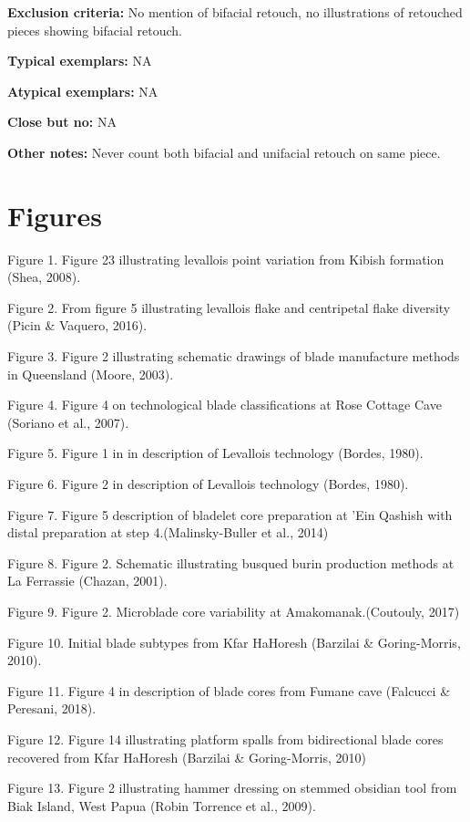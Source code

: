 \documentclass[
]{article}
\begin{document}
\textbf{Exclusion criteria:} No mention of bifacial retouch, no
illustrations of retouched pieces showing bifacial retouch.

\textbf{Typical exemplars:} NA

\textbf{Atypical exemplars:} NA

\textbf{Close but no:} NA

\textbf{Other notes:} Never count both bifacial and unifacial retouch on
same piece.

\hypertarget{figures}{%
\section{Figures}\label{figures}}

Figure 1. Figure 23 illustrating levallois point variation from Kibish
formation (Shea, 2008).

Figure 2. From figure 5 illustrating levallois flake and centripetal
flake diversity (Picin \& Vaquero, 2016).

Figure 3. Figure 2 illustrating schematic drawings of blade manufacture
methods in Queensland (Moore, 2003).

Figure 4. Figure 4 on technological blade classifications at Rose
Cottage Cave (Soriano et al., 2007).

Figure 5. Figure 1 in in description of Levallois technology (Bordes,
1980).

Figure 6. Figure 2 in description of Levallois technology (Bordes,
1980).

Figure 7. Figure 5 description of bladelet core preparation at 'Ein
Qashish with distal preparation at step 4.(Malinsky-Buller et al., 2014)

Figure 8. Figure 2. Schematic illustrating busqued burin production
methods at La Ferrassie (Chazan, 2001).

Figure 9. Figure 2. Microblade core variability at Amakomanak.(Coutouly,
2017)

Figure 10. Initial blade subtypes from Kfar HaHoresh (Barzilai \&
Goring-Morris, 2010).

Figure 11. Figure 4 in description of blade cores from Fumane cave
(Falcucci \& Peresani, 2018).

Figure 12. Figure 14 illustrating platform spalls from bidirectional
blade cores recovered from Kfar HaHoresh (Barzilai \& Goring-Morris,
2010)

Figure 13. Figure 2 illustrating hammer dressing on stemmed obsidian
tool from Biak Island, West Papua (Robin Torrence et al., 2009).
\end{document}
